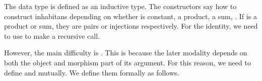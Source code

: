 The data type    is defined as an inductive type.
The constructors say how to construct inhabitans depending on whether  is constant, a product, a sum, \etc.
If  is a product or sum, they are pairs or injections respectively.
For the identity, we need to use  to make a recursive call.


However, the main difficulty is .
This is because the later modality depends on both the object and morphism part of its argument.
For this reason, we need to define  and  mutually.
We define them formally as follows.

\begin{code}%
\>[0][@{}l@{\AgdaIndent{1}}]%
\>[2]\AgdaSpace{}%
\AgdaSpace{}%
\AgdaSymbol{(}\AgdaSpace{}%
\AgdaSymbol{:}\AgdaSpace{}%
\AgdaSpace{}%
\AgdaSymbol{)}\AgdaSpace{}%
\AgdaSymbol{:}\AgdaSpace{}%
\AgdaSpace{}%
\AgdaSpace{}%
\AgdaSpace{}%
\AgdaSpace{}%
\AgdaSpace{}%
\AgdaSpace{}%
\<%
\\
\>[2][@{}l@{\AgdaIndent{0}}]%
\>[4]\AgdaSpace{}%
\AgdaSymbol{:}\AgdaSpace{}%
\AgdaSymbol{\{}\AgdaSpace{}%
\AgdaSymbol{:}\AgdaSpace{}%
\AgdaSymbol{\}}\AgdaSpace{}%
\AgdaSymbol{\{}\AgdaSpace{}%
\AgdaSymbol{:}\AgdaSpace{}%
\AgdaSymbol{\}}\AgdaSpace{}%
\AgdaSpace{}%
\AgdaSpace{}%
\AgdaSpace{}%
\AgdaSpace{}%
\AgdaSpace{}%
\AgdaSpace{}%
\AgdaSpace{}%
\AgdaSymbol{(}\AgdaSpace{}%
\AgdaSymbol{)}\AgdaSpace{}%
\<%
\\
%
\>[4]\AgdaSpace{}%
\AgdaSymbol{:}\AgdaSpace{}%
\AgdaSymbol{\}}\AgdaSpace{}%
\AgdaSpace{}%
\AgdaSpace{}%
\AgdaSpace{}%
\AgdaSpace{}%
\AgdaSpace{}%
\AgdaSpace{}%
\AgdaSpace{}%
\AgdaSpace{}%
\AgdaSpace{}%
\<%
\\
%
\>[4]\AgdaOperator{\AgdaInductiveConstructor{\AgdaUnderscore{},\AgdaUnderscore{}}}\AgdaSpace{}%
\AgdaSymbol{:}\AgdaSpace{}%
\AgdaSpace{}%

\end{code}

